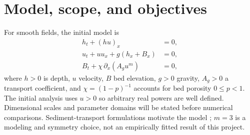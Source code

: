 \documentclass[12pt,a4paper]{article}
\begin{document}
\section{Model, scope, and objectives}
For smooth fields, the initial model is
\begin{equation}
\begin{aligned}
h_t+(hu)_x&=0,\\
u_t+uu_x+g(h_x+B_x)&=0,\\
B_t+\chi\,\partial_x(A_g u^m)&=0,
\end{aligned}
\label{eq:sve}
\end{equation}
where $h>0$ is depth, $u$ velocity, $B$ bed elevation, $g>0$ gravity, $A_g>0$ a transport coefficient, and $\chi=(1-p)^{-1}$ accounts for bed porosity $0\leq p<1$. The initial analysis uses $u>0$ so arbitrary real powers are well defined. Dimensional scales and parameter domains will be stated before numerical comparisons. Sediment-transport formulations motivate the model \cite{hudson}; $m=3$ is a modeling and symmetry choice, not an empirically fitted result of this project.
\end{document}
